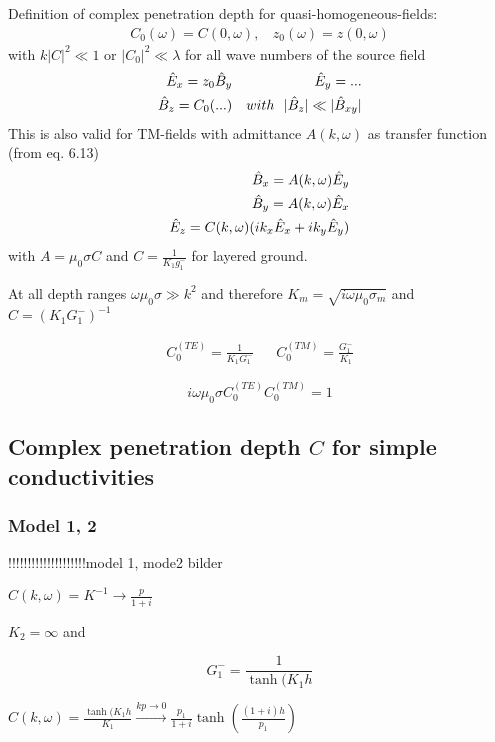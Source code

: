 Definition of complex penetration depth for quasi-homogeneous-fields:
\begin{align*}
C_0(\omega)=C(0,\omega),~~~~z_0(\omega)=z(0,\omega)
\end{align*}
with $k|C|^2\ll 1$ or $|C_0|^2\ll \lambda$ for all wave numbers of the source field
\begin{align*}
\hat{E}_x=z_0\hat{B}_y && \hat{E}_y=...\\
\hat{B}_z=C_0(...) &&with~~ |\hat{B}_z|\ll|\hat{B}_{xy}|
\end{align*}
This is also valid for TM-fields with admittance $A(k,\omega)$ as transfer function (from eq. 6.13)
\begin{equation}
\begin{split}
\hat{B}_x=A(k,\omega)\hat{E}_y\\
\hat{B}_y=A(k,\omega)\hat{E}_x\\
\hat{E}_z=C(k,\omega)(ik_x\hat{E}_x+ik_y\hat{E}_y)
\end{split}
\end{equation}
with $A=\mu_0\sigma C$ and $C=\frac{1}{K_1g_1^-}$ for layered ground.

At all depth ranges $\omega\mu_0\sigma\gg k^2$ and therefore $K_m=\sqrt{i\omega\mu_0\sigma_m}$ and $C=(K_1G_1^-)^{-1}$

\begin{align*}
C_0^{(TE)}=\frac{1}{K_1G_1^-}&& C_0^{(TM)}=\frac{G_1^-}{K_1}
\end{align*}

\begin{equation}
i\omega\mu_0\sigma C_0^{(TE)}C_0^{(TM)}=1
\end{equation}

\subsection{Complex penetration depth $C$ for simple conductivities}

\subsubsection*{Model 1, 2}
!!!!!!!!!!!!!!!!!!!!model 1, mode2 bilder

$C(k,\omega)=K^{-1}\rightarrow\frac{p}{1+i}$

$K_2=\infty$ and 

\begin{equation}
G_1^-=\frac{1}{\tanh(K_1h}
\end{equation}

$C(k,\omega)=\frac{\tanh(K_1h}{K_1}\stackrel{kp\rightarrow 0}\rightarrow\frac{p_1}{1+i}\tanh\left(\frac{(1+i)h}{p_1}\right)$

